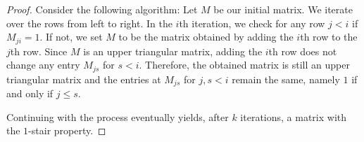 \documentclass[manuscript,screen,review]{acmart}
\begin{document}
\begin{proof} 
Consider the following algorithm: Let $M$ be our initial matrix. We iterate over the rows from left to right. In the $i$th iteration, we check for any row $j<i$ if $M_{ji} = 1$. If not, we set $M$ to be the matrix obtained by adding the $i$th row to the $j$th row. Since $M$ is an upper triangular matrix, adding the $i$th row does not change any entry $M_{js}$ for $s<i$. Therefore, the obtained matrix is still an upper triangular matrix and the entries at $M_{js}$ for $j,s < i$ remain the same, namely $1$ if and only if $j\le s$. 

Continuing with the process eventually yields, after $k$ iterations, a matrix with the $1$-stair property.
\end{proof}


\fi
\end{document}
